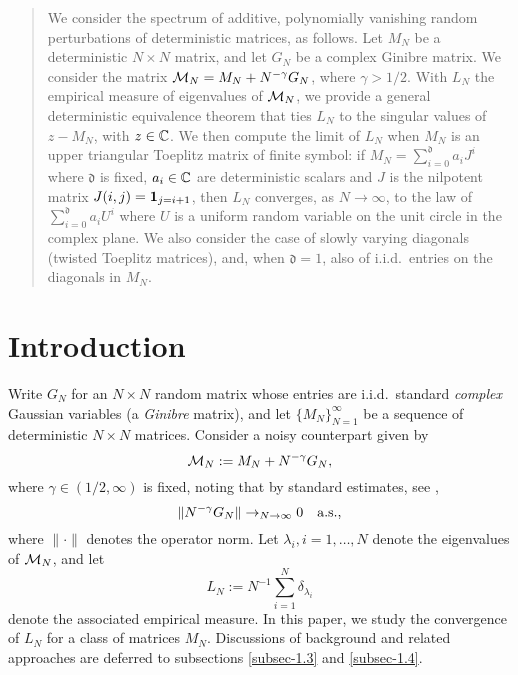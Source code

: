\documentclass{amsart}
\numberwithin{equation}{section}
\def\corEE{\textcolor{amethyst}}
\def\corEE{}
\def\corAB{}
\begin{document}
\begin{abstract}
  We consider the spectrum of
  additive, polynomially vanishing  random
  perturbations of deterministic matrices, as follows.
  Let $M_N$ be a deterministic $N\times N$ matrix, and
  let $G_N$ be \corEE{a complex Ginibre} matrix. We consider
  the matrix $\mathcal{M}_N=M_N+N^{-\gamma}G_N$, where $\gamma>1/2$. With $L_N$
  the empirical measure of eigenvalues of $\mathcal{M}_N$, we
  provide a general deterministic equivalence theorem that ties $L_N$ to
  the singular values of $z-M_N$, with $z\in \mathbb{C}$. We then compute the limit
  of $L_N$ when $M_N$ is an upper triangular
  Toeplitz matrix of finite symbol: if
  $M_N=\sum_{i=0}^{\corAB{\mathfrak{d}}} a_i J^i$ where $\corAB{\mathfrak{d}}$ is fixed, $a_i\in \mathbb{C}$ are deterministic scalars and $J$ is the nilpotent
  matrix $J(i,j)={\bf 1}_{j=i+1}$, then
  $L_N$ converges, as $N\to\infty$, to the law of $\sum_{i=0}^{\corAB{\mathfrak{d}}} a_i U^i$
  where $U$ is a uniform random variable \corAB{on the unit circle in the complex plane}.
  We also consider the case of slowly varying diagonals (twisted
  Toeplitz matrices), and, when $\corAB{\mathfrak{d}}=1$,
  also
  of i.i.d.~entries on the diagonals in $M_N$.
\end{abstract}

\maketitle

\section{Introduction}
Write $G_{N}$ for an $N \times N$ random matrix whose
entries are i.i.d.~standard \emph{complex} Gaussian variables
(a \textit{Ginibre} matrix), and
let $\{M_N\}_{N=1}^{\infty}$ be a sequence of deterministic
$N \times N$ matrices.
Consider a noisy counterpart
given by
\begin{equation}
  \label{eq-1}
  \mathcal{M}_N:=M_N+N^{-\gamma}G_N,
\end{equation}
where $\gamma\in (1/2,\infty)$ is fixed, noting that
by standard estimates, see \cite[Corollary 1.2]{gordon},
\begin{equation}
  \label{eq-gordon}
  \|N^{-\gamma} G_N\|\to_{N\to\infty} 0\quad  \mbox{\rm a.s.},
\end{equation}
where
$\|\cdot \|$ denotes the operator norm.
Let $\lambda_i, i=1,\ldots,N$
denote the eigenvalues of $\mathcal{M}_N$, and let
\begin{equation}
  \label{eq-defln}
  L_N:=N^{-1}\sum_{i=1}^N \delta_{\lambda_i}
\end{equation}
denote the associated
empirical measure.
In this paper, we study the convergence of $L_N$ for a class of matrices $M_N$. Discussions of background and related approaches are deferred to subsections 
\ref{subsec-1.3} and \ref{subsec-1.4}.
\end{document}
